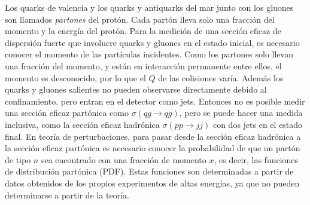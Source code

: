 Los quarks de valencia y los quarks y antiquarks del mar junto con los gluones
son llamados \emph{partones} del protón. Cada partón lleva solo una fracción del
momento y la energía del protón. Para la medición de una sección eficaz de
dispersión fuerte que involucre quarks y gluones en el estado inicial, es
necesario conocer el momento de las partículas incidentes. Como los partones
solo llevan una fracción del momento, y están en interacción permanente entre
ellos, el momento es desconocido, por lo que el $Q$ de las colisiones varía.
Además los quarks y gluones salientes no pueden observarse directamente debido
al confinamiento, pero entran en el detector como jets. Entonces no es posible
medir una sección eficaz partónica como $\sigma(qg \to qg)$, pero se puede hacer
una medida inclusiva, como la sección eficaz hadrónica $\sigma(pp \to jj)$ con
dos jets en el estado final. En teoría de perturbaciones, para pasar
desde la sección eficaz hadrónica a la sección eficaz partónica es necesario
conocer la probabilidad de que un partón de tipo $n$ sea encontrado con una
fracción de momento $x$, es decir, las funciones de distribución partónica
(PDF). Estas funciones son determinadas a partir de datos obtenidos de los
propios experimentos de altas energías, ya que no pueden determinarse a partir
de la teoría.



